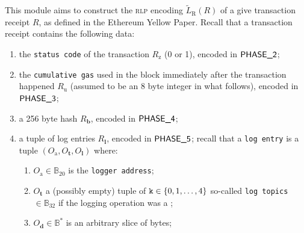 This module aims to construct the \textsc{rlp} encoding $\widetilde{L}_{\mathrm{R}}(R)$ of a give transaction receipt $R$, as defined in the Ethereum Yellow Paper. Recall that a transaction receipt contains the following data:
\begin{enumerate}
	\item the \texttt{status code} of the transaction $R_{\mathrm{z}}$ (0 or 1), encoded in $\textsf{PHASE\_2}$;
	\item the \texttt{cumulative gas} used in the block immediately after the transaction happened $R_{\text{u}}$ (assumed to be an 8 byte integer in what follows), encoded in $\textsf{PHASE\_3}$;
	\item a 256 byte hash $R_\textbf{b}$, encoded in $\textsf{PHASE\_4}$;
	\item a tuple of log entries $R_{\textbf{l}}$, encoded in $\textsf{PHASE\_5}$; recall that a \texttt{log entry} is a tuple $(O_\text{a}, O_\textbf{t}, O_\textbf{l})$ where: 
	\begin{enumerate}
		\item $O_{\text{a}} \in \mathbb{B}_{20}$ is the \texttt{logger address};
		\item $O_{\textbf{t}}$ a (possibly empty) tuple of $\texttt{k}\in\{0,1,\dots,4\}$ so-called \texttt{log topics} $\in \mathbb{B}_{32}$ if the logging operation was a ;
		\item $O_{\textbf{d}} \in \mathbb{B}^*$ is an arbitrary slice of bytes; 
	\end{enumerate} 
\end{enumerate}
